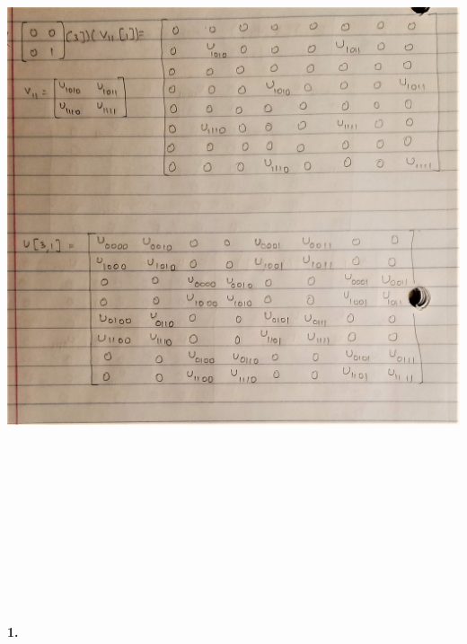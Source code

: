\documentclass [12pt]{article}
\theoremstyle{definition}
\begin{document}
\includegraphics[width=18cm, height=23cm]{I44}

\newpage

{\bf 1.}
\end{document}
